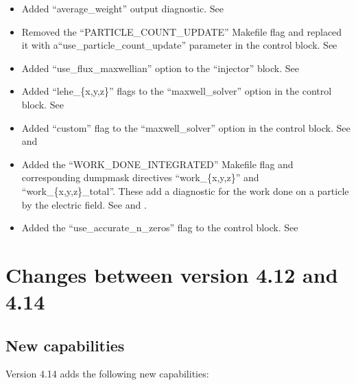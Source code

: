 \begin{itemize}
\item Added ``average\_weight'' output diagnostic.
    See 
\item Removed the ``PARTICLE\_COUNT\_UPDATE'' Makefile flag and replaced
    it with a\linebreak ``use\_particle\_count\_update'' parameter in the
    control block. See 
\item Added ``use\_flux\_maxwellian'' option to the ``injector'' block.
    See 
\item Added ``lehe\_\{x,y,z\}'' flags to the ``maxwell\_solver'' option in
    the control block. See 
\item Added ``custom'' flag to the ``maxwell\_solver'' option in
    the control block. See  and 
\item Added the ``WORK\_DONE\_INTEGRATED'' Makefile flag and corresponding
    dumpmask directives ``work\_\{x,y,z\}'' and ``work\_\{x,y,z\}\_total''.
    These add a diagnostic for the work done on a particle by the electric
    field. See  and .
\item Added the ``use\_accurate\_n\_zeros'' flag to the control block.
    See 
\end{itemize}
\bigskip


\section{Changes between version 4.12 and 4.14}

\subsection{New capabilities}
Version 4.14 adds the following new capabilities:

